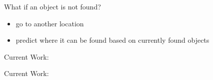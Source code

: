\documentclass{beamer}
\begin{document}
\begin{frame}{What if an object is not found?}

\begin{itemize}
\item go to another location
\item predict where it can be found based on currently found objects
\end{itemize}

\end{frame}

\begin{frame}{Current Work: }


\end{frame}

\begin{frame}{Current Work: }
\end{frame}
\end{document}
